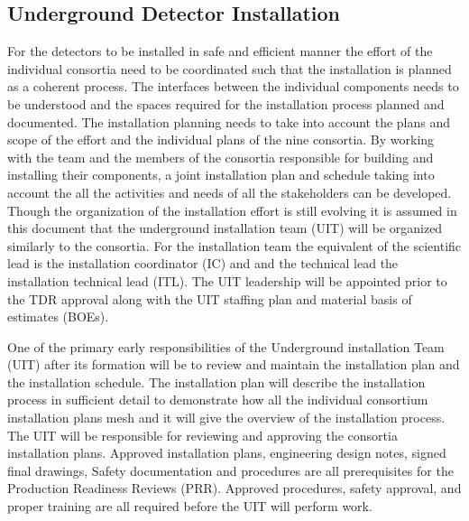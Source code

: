 

\subsection{Underground Detector Installation}
\label{sec:fdsp-coord-undergd}

For the  detectors to be installed in safe and efficient
manner the effort of the individual consortia need to be coordinated
such that the installation is planned as a coherent process. The
interfaces between the individual components needs to be understood
and the spaces required for the installation process planned and
documented. The installation planning needs to take into account the
plans and scope of the  effort and the individual plans of
the nine consortia. By working with the  team and the
members of the consortia responsible for building and installing their
components, a joint installation plan and schedule taking into account
the all the activities and needs of all the stakeholders can be
developed. Though the organization of the installation effort is still
evolving it is assumed in this document that the underground
installation team (UIT) will be organized similarly to the
consortia. For the installation team the equivalent of the scientific
lead is the installation coordinator (IC) and and the technical lead
the installation technical lead (ITL). The UIT leadership will be
appointed prior to the TDR approval along with the UIT staffing plan
and material basis of estimates (BOEs).

One of the primary early responsibilities of the Underground
installation Team (UIT) after its formation will be to review and
maintain the  installation plan and the installation
schedule. The  installation plan will describe the
installation process in sufficient detail to demonstrate how all the
individual consortium installation plans mesh and it will give the
overview of the installation process. The UIT will be responsible for
reviewing and approving the consortia installation plans. Approved
installation plans, engineering design notes, signed final drawings,
Safety documentation and procedures are all prerequisites for the
Production Readiness Reviews (PRR). Approved procedures, safety
approval, and proper training are all required before the UIT will
perform work.
  
